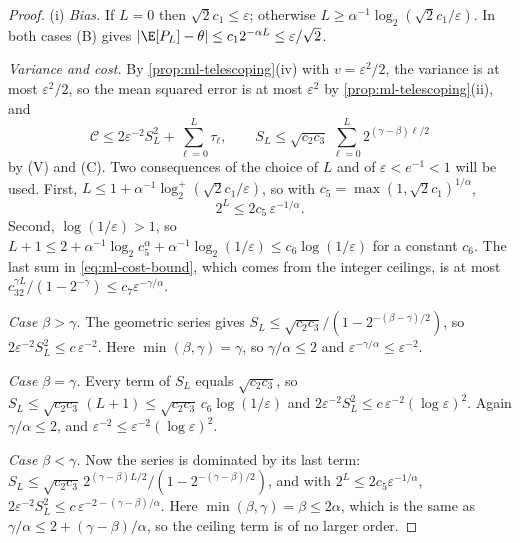 \begin{proof}
(i) \emph{Bias.} If $L=0$ then $\sqrt2c_1\le\varepsilon$; otherwise
$L\ge\alpha^{-1}\log_2(\sqrt2c_1/\varepsilon)$. In both cases (B) gives
$|\E[P_L]-\theta|\le c_12^{-\alpha L}\le\varepsilon/\sqrt2$.

\emph{Variance and cost.} By \cref{prop:ml-telescoping}(iv) with $v=\varepsilon^2/2$, the
variance is at most $\varepsilon^2/2$, so the mean squared error is at most $\varepsilon^2$ by
\cref{prop:ml-telescoping}(ii), and
\begin{equation}\label{eq:ml-cost-bound}
  \mathcal C\le2\varepsilon^{-2}S_L^2+\sum_{\ell=0}^L\tau_\ell,\qquad
  S_L\le\sqrt{c_2c_3}\,\sum_{\ell=0}^L2^{(\gamma-\beta)\ell/2}
\end{equation}
by (V) and (C). Two consequences of the choice of $L$ and of $\varepsilon<e^{-1}<1$ will be used.
First, $L\le1+\alpha^{-1}\log_2^+(\sqrt2c_1/\varepsilon)$, so with $c_5=\max(1,\sqrt2c_1)^{1/\alpha}$,
\[
  2^L\le2c_5\,\varepsilon^{-1/\alpha}.
\]
Second, $\log(1/\varepsilon)>1$, so $L+1\le2+\alpha^{-1}\log_2c_5^\alpha+\alpha^{-1}\log_2(1/\varepsilon)\le c_6\log(1/\varepsilon)$
for a constant $c_6$. The last sum in \eqref{eq:ml-cost-bound}, which comes from the integer
ceilings, is at most $c_32^{\gamma L}/(1-2^{-\gamma})\le c_7\varepsilon^{-\gamma/\alpha}$.

\emph{Case $\beta>\gamma$.} The geometric series gives $S_L\le\sqrt{c_2c_3}/(1-2^{-(\beta-\gamma)/2})$,
so $2\varepsilon^{-2}S_L^2\le c\,\varepsilon^{-2}$. Here $\min(\beta,\gamma)=\gamma$, so
$\gamma/\alpha\le2$ and $\varepsilon^{-\gamma/\alpha}\le\varepsilon^{-2}$.

\emph{Case $\beta=\gamma$.} Every term of $S_L$ equals $\sqrt{c_2c_3}$, so
$S_L\le\sqrt{c_2c_3}\,(L+1)\le\sqrt{c_2c_3}\,c_6\log(1/\varepsilon)$ and
$2\varepsilon^{-2}S_L^2\le c\,\varepsilon^{-2}(\log\varepsilon)^2$. Again $\gamma/\alpha\le2$, and
$\varepsilon^{-2}\le\varepsilon^{-2}(\log\varepsilon)^2$.

\emph{Case $\beta<\gamma$.} Now the series is dominated by its last term:
$S_L\le\sqrt{c_2c_3}\,2^{(\gamma-\beta)L/2}/(1-2^{-(\gamma-\beta)/2})$, and with
$2^L\le2c_5\varepsilon^{-1/\alpha}$, $2\varepsilon^{-2}S_L^2\le c\,\varepsilon^{-2-(\gamma-\beta)/\alpha}$.
Here $\min(\beta,\gamma)=\beta\le2\alpha$, which is the same as
$\gamma/\alpha\le2+(\gamma-\beta)/\alpha$, so the ceiling term is of no larger order.


\end{proof}
